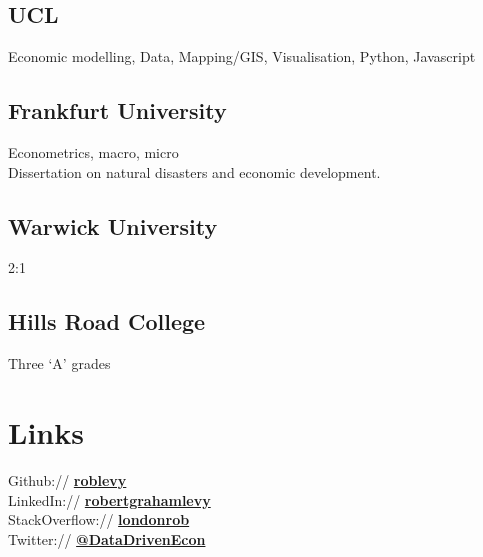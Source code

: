 \documentclass[a4paper]{deedy-resume} %
\begin{document}
\begin{minipage}[t]{0.3\textwidth}
    \subsection{UCL}
    
    Economic modelling, Data, Mapping/GIS, Visualisation, Python, Javascript
    \sectionspace

    \subsection{Frankfurt University}

    Econometrics, macro, micro\\
    Dissertation on natural disasters and economic development.
    \sectionspace %

    \subsection{Warwick University}
    2:1
    \sectionspace %


    \subsection{Hills Road College}
    Three `A' grades\\
    \sectionspace %


    \section{Links} 

    Github:// \href{https://github.com/roblevy}{\bf roblevy} \\
    LinkedIn:// \href{http://uk.linkedin.com/in/robertgrahamlevy}{\bf robertgrahamlevy} \\
    StackOverflow:// \href{http://stackoverflow.com/londonrob}{\bf londonrob} \\
    Twitter:// \href{http://twitter.com/aid\_complexity}{\bf @DataDrivenEcon} \\

    \sectionspace %


\end{minipage} %
\end{document}
